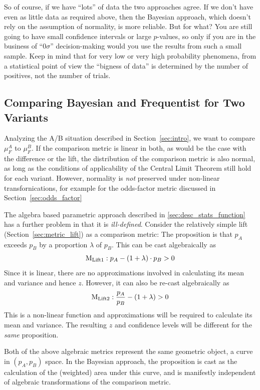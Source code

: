 \documentclass[letterpaper,12pt]{article}
\newcommand{\bdm}{\begin{displaymath}} %
\newcommand{\edm}{\end{displaymath}} %
\begin{document}
So of course, if we have ``lots'' of data the two approaches agree.
If we don't have even as little data as required above, then the
Bayesian approach, which doesn't rely on the assumption of normality,
is more reliable. But for what? You are still going to have small
confidence intervals or large \(p\)-values, so only if you are in the
business of ``0\(\sigma\)'' decision-making would you use the results
from such a small sample. Keep in mind that for very low or very high
probability phenomena, from a statistical point of view the ``bigness
of data'' is determined by the number of positives, not the number of
trials.

\subsection{Comparing Bayesian and Frequentist for Two Variants}\label{sec:BvsF2}
Analyzing the A/B situation described in Section~\ref{sec:intro}, we
want to compare \(\mu^A_F\) to \(\mu^B_F\). If the comparison metric
is linear in both, as would be the case with the difference or the
lift, the distribution of the comparison metric is also normal, as
long as the conditions of applicability of the Central Limit Theorem
still hold for each variant. However, normality is {\em not} preserved
under non-linear transfornications, for example for the odds-factor
metric discussed in Section~\ref{sec:odds_factor}

The algebra based parametric approach described in \ref{sec:desc_stats_function} has a further
problem in that it is {\em ill-defined}.
Consider the relatively simple lift (Section~\ref{sec:metric_lift}) as a
comparison metric: The proposition is that \(p_A\) exceeds \(p_B\) by a
proportion \(\lambda\) of \(p_B\). This can be cast algebraically as
\bdm
{\rm M_{Lift1} }: p_A - (1+\lambda)\cdot p_B > 0
\edm
Since it is linear, there are no approximations involved in calculating
its mean and variance and hence \(z\). However, it can also be re-cast
algebraically as
\bdm
{\rm M_{Lift2} }: \frac{p_A}{p_B} - (1+\lambda) > 0
\edm
This is a non-linear function and approximations will be required to calculate
its mean and variance. The resulting \(z\) and confidence levels
will be different for the {\em same} proposition.

Both of the above algebraic metrics represent the same geometric object,
a curve in \((p_A, p_B)\) space. In the Bayesian approach, the proposition is
cast as the calculation of
the (weighted) area under this curve, and is manifestly independent of
algebraic transformations of the comparison metric.
\end{document}
